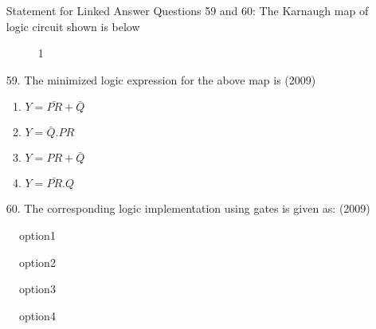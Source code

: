 \documentclass[journal]{IEEEtran}
\begin{document}
\begin{enumerate}
    Statement for Linked Answer Questions 59 and 60:
    The Karnaugh map of logic circuit shown is below 
    \newpage
    \begin{figure}[!ht]
        \centering
        \caption{1}
        \label{fig1}
    \end{figure}
    \item[59.] The minimized logic expression for the above map is \hfill (2009)
    \begin{enumerate}[label=(\Alph*)]
        \item $Y=\bar{PR} + \bar{Q}$
        \item $Y=\bar{Q} .PR$
        \item $Y=PR + \bar{Q}$
        \item $Y=\bar{PR}.Q$
    \end{enumerate}
    \item[60.] The corresponding logic implementation using gates is given as: \hfill (2009)
     \end{enumerate}
    \begin{figure}[!ht]
        \centering
        \caption{option1}
    \end{figure}
    \begin{figure}[!ht]
        \centering
        \caption{option2}
    \end{figure}
    \begin{figure}[!ht]
        \centering
        \caption{option3}
    \end{figure}
    \begin{figure}[!ht]
        \centering
        \caption{option4}
    \end{figure}
\end{document}

